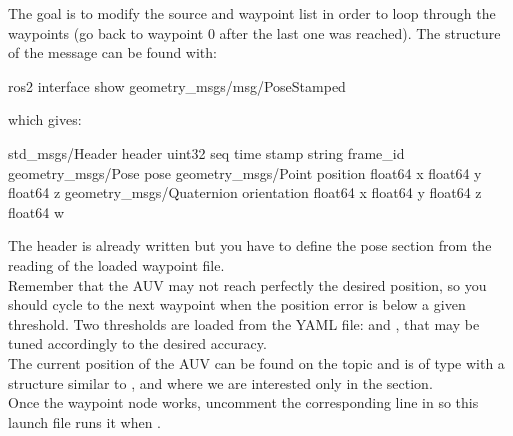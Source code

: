\documentclass{ecnreport}
\begin{document}
The goal is to modify the source and waypoint list in order to loop through the waypoints (go back to waypoint 0 after the last one was reached).
The structure of the  message can be found with:
\begin{bashcodelarge}
ros2 interface show geometry_msgs/msg/PoseStamped
\end{bashcodelarge}
which gives:
\begin{bashcodelarge}
std_msgs/Header header
  uint32 seq
  time stamp
  string frame_id
geometry_msgs/Pose pose
  geometry_msgs/Point position
    float64 x
    float64 y
    float64 z
  geometry_msgs/Quaternion orientation
    float64 x
    float64 y
    float64 z
    float64 w
\end{bashcodelarge}
The header is already written but you have to define the pose section from the reading of the loaded waypoint file.\\

Remember that the AUV may not reach perfectly the desired position, so you should cycle to the next waypoint when the position error is below a given threshold.
Two thresholds are loaded from the YAML file:  and , that may be tuned accordingly to the desired accuracy.\\
The current position of the AUV can be found on the topic  and is of type  with a structure similar to , and where we are interested only
in the  section.\\

Once the waypoint node works, uncomment the corresponding line in  so this launch file runs it when .


%

%
%
%
\end{document}
